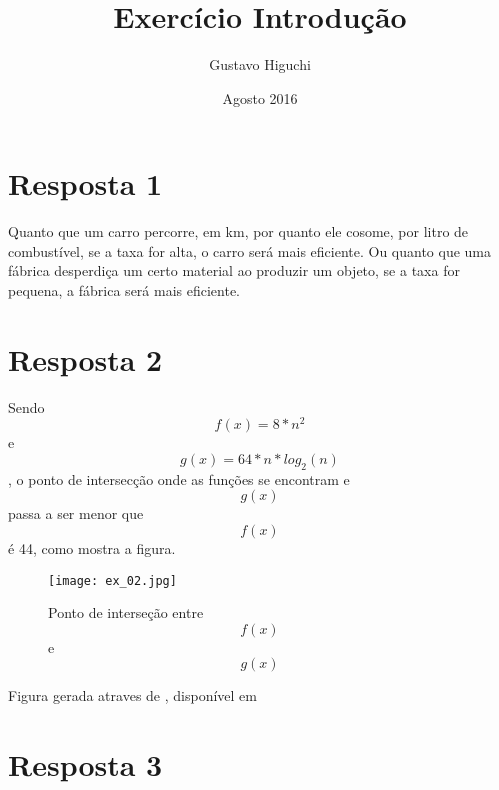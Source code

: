 \documentclass{article}
\title{Exercício Introdução}
\author{Gustavo Higuchi}
\date{Agosto 2016}
\begin{document}
\maketitle
\section{Resposta 1 }
Quanto que um carro percorre, em km, por quanto ele cosome, por litro de combustível, se a taxa for alta, o carro será mais eficiente.
Ou quanto que uma fábrica desperdiça um certo material ao produzir um objeto, se a taxa for pequena, a fábrica será mais eficiente.

\section{Resposta 2}

Sendo \[f(x)=8*n^2\] e \[g(x)=64*n*log_2(n)\], o ponto de intersecção onde as funções se encontram
e \[g(x)\] passa a ser menor que \[f(x)\] é 44, como mostra a figura.

\begin{figure}[h!]
\centering
\texttt{[image: ex\_02.jpg]}
\caption{Ponto de interseção entre \[f(x)\] e \[g(x)\]}
\label{fig:univerise}
\end{figure}

Figura gerada atraves de , disponível em 
\section{Resposta 3}
\end{document}
